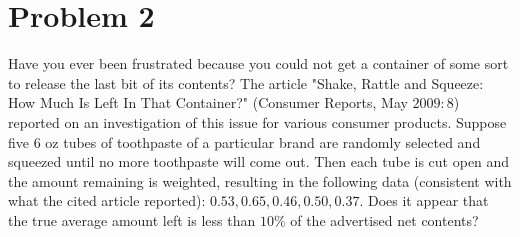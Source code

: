 \section*{Problem 2}

\noindent 
Have you ever been frustrated because you could not get a container of some sort to release the last bit of its contents? The article "Shake, Rattle and Squeeze: How Much Is Left In That Container?" (Consumer Reports, May $2009: 8$) reported on an investigation of this issue for various consumer products. Suppose five $6$ oz tubes of toothpaste of a particular brand are randomly selected and squeezed until no more toothpaste will come out. Then each tube is cut open and the amount remaining is weighted, resulting in the following data (consistent with what the cited article reported): $0.53, 0.65, 0.46, 0.50, 0.37$. Does it appear that the true average amount
left is less than $10$\% of the advertised net contents?

